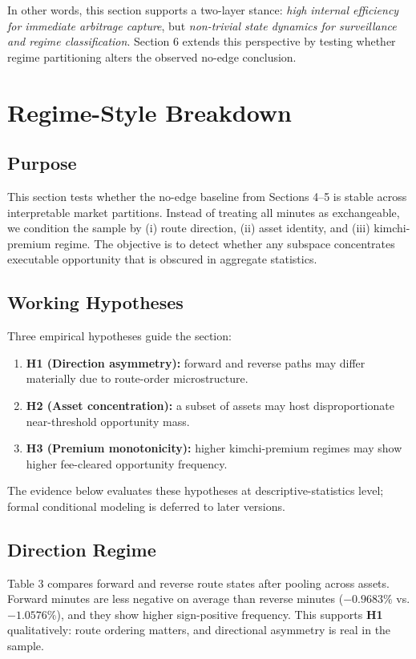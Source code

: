 \documentclass[11pt,a4paper]{article}
\begin{document}
In other words, this section supports a two-layer stance: \emph{high internal efficiency for immediate arbitrage capture}, but \emph{non-trivial state dynamics for surveillance and regime classification}. Section 6 extends this perspective by testing whether regime partitioning alters the observed no-edge conclusion.

\section{Regime-Style Breakdown}
\subsection{Purpose}
This section tests whether the no-edge baseline from Sections 4--5 is stable across interpretable market partitions. Instead of treating all minutes as exchangeable, we condition the sample by (i) route direction, (ii) asset identity, and (iii) kimchi-premium regime. The objective is to detect whether any subspace concentrates executable opportunity that is obscured in aggregate statistics.

\subsection{Working Hypotheses}
Three empirical hypotheses guide the section:
\begin{enumerate}
    \item \textbf{H1 (Direction asymmetry):} forward and reverse paths may differ materially due to route-order microstructure.
    \item \textbf{H2 (Asset concentration):} a subset of assets may host disproportionate near-threshold opportunity mass.
    \item \textbf{H3 (Premium monotonicity):} higher kimchi-premium regimes may show higher fee-cleared opportunity frequency.
\end{enumerate}
The evidence below evaluates these hypotheses at descriptive-statistics level; formal conditional modeling is deferred to later versions.

\subsection{Direction Regime}
\noindent Table 3 compares forward and reverse route states after pooling across assets. Forward minutes are less negative on average than reverse minutes ($-0.9683\%$ vs. $-1.0576\%$), and they show higher sign-positive frequency. This supports \textbf{H1} qualitatively: route ordering matters, and directional asymmetry is real in the sample.
\end{document}
